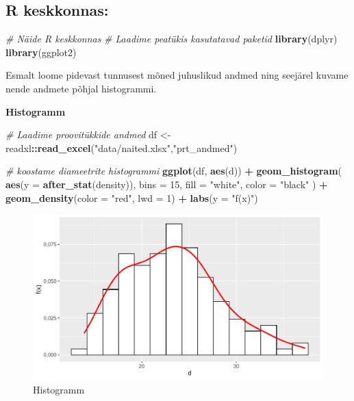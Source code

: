 \documentclass[
]{book}
\newenvironment{Shaded}{\begin{snugshade}}{\end{snugshade}}
\newcommand{\AttributeTok}[1]{\textcolor[rgb]{0.13,0.29,0.53}{#1}}
\newcommand{\CommentTok}[1]{\textcolor[rgb]{0.56,0.35,0.01}{\textit{#1}}}
\newcommand{\DecValTok}[1]{\textcolor[rgb]{0.00,0.00,0.81}{#1}}
\newcommand{\FunctionTok}[1]{\textcolor[rgb]{0.13,0.29,0.53}{\textbf{#1}}}
\newcommand{\NormalTok}[1]{#1}
\newcommand{\OtherTok}[1]{\textcolor[rgb]{0.56,0.35,0.01}{#1}}
\newcommand{\SpecialCharTok}[1]{\textcolor[rgb]{0.81,0.36,0.00}{\textbf{#1}}}
\newcommand{\StringTok}[1]{\textcolor[rgb]{0.31,0.60,0.02}{#1}}
\renewenvironment{Shaded} {\begin{snugshade}\footnotesize} {\end{snugshade}}
\theoremstyle{definition}
\theoremstyle{definition}
\theoremstyle{definition}
\theoremstyle{definition}
\theoremstyle{remark}
\begin{document}
\subsection{R keskkonnas:}\label{r-keskkonnas}

\begin{Shaded}
\begin{Highlighting}[]
\CommentTok{\# Näide R keskkonnas}
\CommentTok{\# Laadime peatükis kasutatavad paketid}
\FunctionTok{library}\NormalTok{(dplyr)}
\FunctionTok{library}\NormalTok{(ggplot2)}
\end{Highlighting}
\end{Shaded}

Esmalt loome pidevast tunnusest mõned juhuslikud andmed ning seejärel kuvame nende andmete põhjal histogrammi.

\textbf{Histogramm}

\begin{Shaded}
\begin{Highlighting}[]
\CommentTok{\# Laadime proovitükkide andmed}
\NormalTok{df }\OtherTok{\textless{}{-}}\NormalTok{ readxl}\SpecialCharTok{::}\FunctionTok{read\_excel}\NormalTok{(}\StringTok{"data/naited.xlsx"}\NormalTok{,}\StringTok{"prt\_andmed"}\NormalTok{)}

\CommentTok{\# koostame diameetrite histogrammi}
\FunctionTok{ggplot}\NormalTok{(df, }\FunctionTok{aes}\NormalTok{(d)) }\SpecialCharTok{+}
  \FunctionTok{geom\_histogram}\NormalTok{(}
    \FunctionTok{aes}\NormalTok{(}\AttributeTok{y =} \FunctionTok{after\_stat}\NormalTok{(density)),}
    \AttributeTok{bins =} \DecValTok{15}\NormalTok{,}
    \AttributeTok{fill =} \StringTok{"white"}\NormalTok{,}
    \AttributeTok{color =} \StringTok{"black"}
\NormalTok{  ) }\SpecialCharTok{+}
  \FunctionTok{geom\_density}\NormalTok{(}\AttributeTok{color =} \StringTok{"red"}\NormalTok{, }\AttributeTok{lwd =} \DecValTok{1}\NormalTok{) }\SpecialCharTok{+}
  \FunctionTok{labs}\NormalTok{(}\AttributeTok{y =} \StringTok{"f(x)"}\NormalTok{)}
\end{Highlighting}
\end{Shaded}

\begin{figure}[H]
\includegraphics[width=0.8\linewidth]{_main_files/figure-latex/unnamed-chunk-23-1} \caption{Histogramm}\label{fig:unnamed-chunk-23}
\end{figure}
\end{document}

